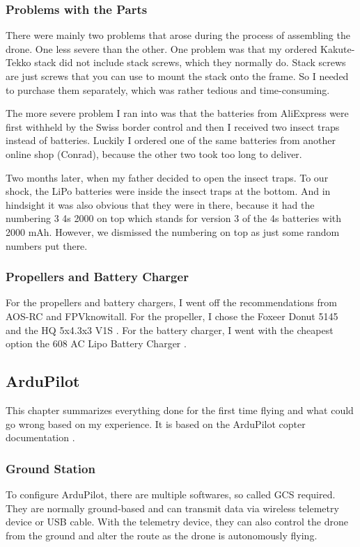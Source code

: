 \documentclass[svgnames]{article}
\begin{document}
	\subsubsection{Problems with the Parts}

	There were mainly two problems that arose during the process of assembling the drone. One less severe than the other. One problem was that my ordered Kakute-Tekko stack did not include stack screws, which they normally do. Stack screws are just screws that you can use to mount the stack onto the frame. So I needed to purchase them separately, which was rather tedious and time-consuming.
	
	The more severe problem I ran into was that the batteries from AliExpress were first withheld by the Swiss border control and then I received two insect traps instead of batteries. Luckily I ordered one of the same batteries from another online shop (Conrad), because the other two took too long to deliver.
	
	Two months later, when my father decided to open the insect traps. To our shock, the LiPo batteries were inside the insect traps at the bottom. And in hindsight it was also obvious that they were in there, because it had the numbering 3 4s 2000 on top which stands for version 3 of the 4s batteries with 2000 mAh. However, we dismissed the numbering on top as just some random numbers put there. 
	
	\subsubsection{Propellers and Battery Charger}
	For the propellers and battery chargers, I went off the recommendations from AOS-RC and FPVknowitall. For the propeller, I chose the Foxeer Donut 5145 \cite{toroidal} and the HQ 5x4.3x3 V1S \cite{hqprops}. For the battery charger, I went with the cheapest option the 608 AC Lipo Battery Charger \cite{lipocharger}.

	\subsection{ArduPilot}
	This chapter summarizes everything done for the first time flying and what could go wrong based on my experience. It is based on the ArduPilot copter documentation \cite{ardupilotdocs}.
	
	\subsubsection{Ground Station}
	To configure ArduPilot, there are multiple softwares, so called \gls{GCS} required. They are normally ground-based and can transmit data via wireless telemetry device or USB cable.  With the telemetry device, they can also control the drone from the ground and alter the route as the drone is autonomously flying. 
	
\end{document}
